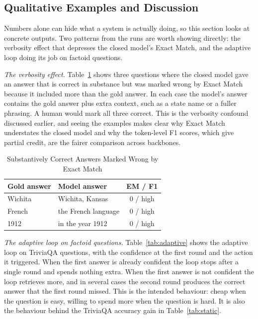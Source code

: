 \documentclass[conference,a4paper,10pt]{IEEEtran}
\begin{document}
\subsection{Qualitative Examples and Discussion}
Numbers alone can hide what a system is actually doing, so this section looks at concrete
outputs. Two patterns from the runs are worth showing directly: the verbosity effect that
depresses the closed model's Exact Match, and the adaptive loop doing its job on factoid
questions.

\textit{The verbosity effect.}
Table~\ref{tab:verbosity} shows three questions where the closed model gave an answer that
is correct in substance but was marked wrong by Exact Match because it included more than
the gold answer. In each case the model's answer contains the gold answer plus extra
context, such as a state name or a fuller phrasing. A human would mark all three correct.
This is the verbosity confound discussed earlier, and seeing the examples makes clear why
Exact Match understates the closed model and why the token-level F1 scores, which give
partial credit, are the fairer comparison across backbones.

\begin{table}[t]
\centering
\caption{Substantively Correct Answers Marked Wrong by Exact Match}
\label{tab:verbosity}
\renewcommand{\arraystretch}{1.2}
\begin{tabular}{llc}
\toprule
\textbf{Gold answer} & \textbf{Model answer} & \textbf{EM / F1} \\
\midrule
Wichita & Wichita, Kansas & 0 / high \\
French & the French language & 0 / high \\
1912 & in the year 1912 & 0 / high \\
\bottomrule
\end{tabular}
\end{table}

\textit{The adaptive loop on factoid questions.}
Table~\ref{tab:adaptive} shows the adaptive loop on TriviaQA questions, with the
confidence at the first round and the action it triggered. When the first answer is
already confident the loop stops after a single round and spends nothing extra. When the
first answer is not confident the loop retrieves more, and in several cases the second
round produces the correct answer that the first round missed. This is the intended
behaviour: cheap when the question is easy, willing to spend more when the question is
hard. It is also the behaviour behind the TriviaQA accuracy gain in
Table~\ref{tab:static}.
\end{document}
